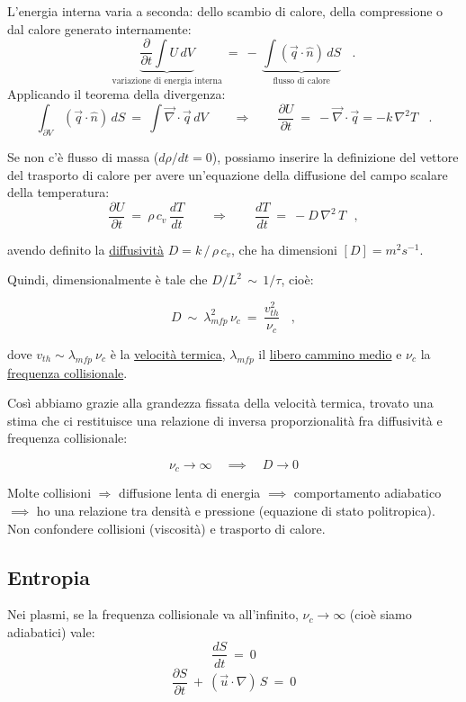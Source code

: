 L'energia interna varia a seconda: dello scambio di calore, della compressione o dal calore generato internamente:
\[
\underset{\text{variazione di energia interna}}{\underbrace{\frac{\partial}{\partial t}\int U \, dV}}\ =\ -\, \underset{\text{flusso di calore}}{\underbrace{\int (\vec q \cdot \hat n)\, dS}} \ \ \ \ .
\]
Applicando il teorema della divergenza:
\[\int_{\partial V} (\vec q \cdot \hat n)\, dS\ =\ \int \vec\nabla \cdot \vec q\, dV \quad \quad \Rightarrow \quad\quad \frac{\partial U}{\partial t}\ =\ -\vec\nabla \cdot \vec q = -k\, \nabla^2 T \ \ \ \ .\]

Se non c'è flusso di massa ($d\rho/dt = 0$), possiamo inserire la definizione del vettore del trasporto di calore per avere un'equazione della diffusione del campo scalare della temperatura:
\[
\frac{\partial U}{\partial t}\ =\ \rho\, c_v\, \frac{dT}{dt} 
\quad\quad \Rightarrow \quad\quad 
\frac{dT}{dt}\ =\ -D\, \nabla^2\, T \ \ \ ,
\]

avendo definito la \underline{diffusività} $\boxed{D = k\, /\, \rho\, c_v}$, che ha dimensioni $[D]=m^2 s^{-1}$.

Quindi, dimensionalmente è tale che $D/L^2\, \sim\, 1/\tau$, cioè:

\[
D\ \sim \ \lambda_{mfp}^2\, \nu_c\ =\ \frac{v_{th}^2}{\nu_c}\ \ \ \ ,
\]

dove $\boxed{v_{th}\sim\lambda_{mfp}\ \nu_c}$ è la \underline{velocità termica}, $\lambda_{mfp}$ il \underline{libero cammino medio} e $\nu_c$ la \underline{frequenza collisionale}.  

Così abbiamo grazie alla grandezza fissata della velocità termica, trovato una stima che ci restituisce una relazione di inversa proporzionalità fra diffusività e frequenza collisionale:

\[\nu_c\to\infty\quad \implies\quad  D\to 0\]

Molte collisioni $\Rightarrow$ diffusione lenta di energia $\implies $ comportamento adiabatico $\implies $ ho una relazione tra densità e pressione (equazione di stato politropica). Non confondere collisioni (viscosità) e trasporto di calore.  

\subsection{Entropia}
Nei plasmi, se la frequenza collisionale va all'infinito, $\nu_c\rightarrow \infty$ (cioè siamo adiabatici) vale:
\[ \frac{dS}{dt}\ =\ 0 \]
\[ \frac{\partial S}{\partial t}\ +\ (\vec u\cdot \nabla)\, S\ =\ 0 \]

